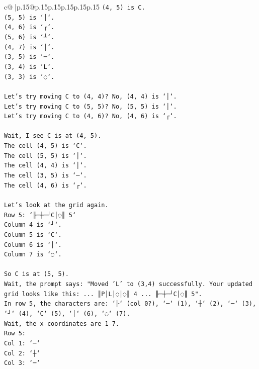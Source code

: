 \documentclass{article}
\begin{document}
{\begin{supertabular}{c@{$\;$}|p{.15\linewidth}@{}p{.15\linewidth}p{.15\linewidth}p{.15\linewidth}p{.15\linewidth}p{.15\linewidth}}
{{{\texttt{(4, 5) is C.} \\
\texttt{(5, 5) is `│`.} \\
\texttt{(4, 6) is `┌`.} \\
\texttt{(5, 6) is `┴`.} \\
\texttt{(4, 7) is `│`.} \\
\texttt{(3, 5) is `─`.} \\
\texttt{(3, 4) is `L`.} \\
\texttt{(3, 3) is `◌`.} \\
\\ 
\texttt{Let's try moving C to (4, 4)? No, (4, 4) is `│`.} \\
\texttt{Let's try moving C to (5, 5)? No, (5, 5) is `│`.} \\
\texttt{Let's try moving C to (4, 6)? No, (4, 6) is `┌`.} \\
\\ 
\texttt{Wait, I see C is at (4, 5).} \\
\texttt{The cell (4, 5) is `C`.} \\
\texttt{The cell (5, 5) is `│`.} \\
\texttt{The cell (4, 4) is `│`.} \\
\texttt{The cell (3, 5) is `─`.} \\
\texttt{The cell (4, 6) is `┌`.} \\
\\ 
\texttt{Let's look at the grid again.} \\
\texttt{Row 5: `╟─┼─┘C│◌║ 5`} \\
\texttt{Column 4 is `┘`.} \\
\texttt{Column 5 is `C`.} \\
\texttt{Column 6 is `│`.} \\
\texttt{Column 7 is `◌`.} \\
\\ 
\texttt{So C is at (5, 5).} \\
\texttt{Wait, the prompt says: "Moved 'L' to (3,4) successfully. Your updated grid looks like this: ... ║P│L│◌│◌║ 4 ... ╟─┼─┘C│◌║ 5".} \\
\texttt{In row 5, the characters are: `╟` (col 0?), `─` (1), `┼` (2), `─` (3), `┘` (4), `C` (5), `│` (6), `◌` (7).} \\
\texttt{Wait, the x{-}coordinates are 1{-}7.} \\
\texttt{Row 5:} \\
\texttt{Col 1: `─`} \\
\texttt{Col 2: `┼`} \\
\texttt{Col 3: `─`} \\
}}}
\end{supertabular}}
\end{document}
